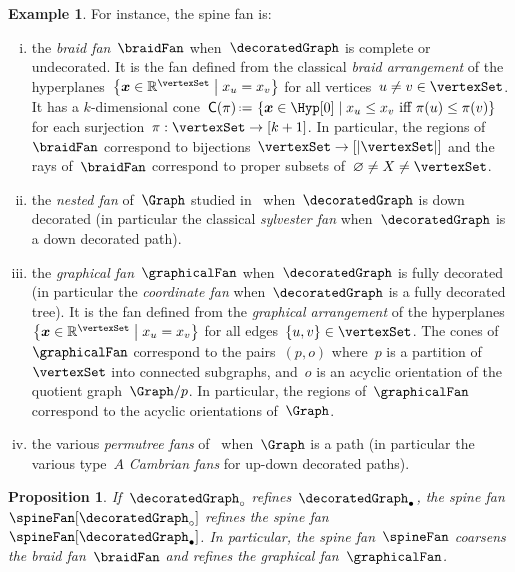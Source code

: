 \documentclass{amsart}
\newtheorem{proposition}[theorem]{Proposition}
\theoremstyle{definition}
\newtheorem{example}[theorem]{Example}
\newcommand{\R}{\mathbb{R}} %
\renewcommand{\b}[1]{{\boldsymbol{#1}}} %
\newcommand{\set}[2]{\left\{ #1 \;\middle|\; #2 \right\}} %
\newcommand{\eqdef}{\mbox{\,\raisebox{0.2ex}{\scriptsize\ensuremath{\mathrm:}}\ensuremath{=}\,}} %
\newcommand{\darkblue}{\color{darkblue}} %
\newcommand{\defn}[1]{\textsl{\darkblue #1}} %
\newcommand{\normalCone}{\mathsf{C}} %
\begin{document}
\begin{example}
  \label{exm:spineFans}
  For instance, the spine fan is:
  \begin{enumerate}[(i)]
    \item the \defn{braid fan}~$\braidFan$ when~$\decoratedGraph$ is complete or undecorated. It is the fan defined from the classical \defn{braid arrangement} of the hyperplanes~$\set{\b{x} \in \R^{\vertexSet}}{x_u = x_v}$ for all vertices~$u \ne v \in \vertexSet$. It has a $k$-dimensional cone~$\normalCone(\pi) \eqdef \set{\b{x} \in \Hyp[0]}{x_u \le x_v \text{ iff } \pi(u) \le \pi(v)}$ for each surjection~$\pi : \vertexSet \to [k+1]$. In particular, the regions of~$\braidFan$ correspond to bijections~${\vertexSet \to [|\vertexSet|]}$ and the rays of~$\braidFan$ correspond to proper subsets of~$\varnothing \ne X \ne \vertexSet$.
    \item the \defn{nested fan} of~$\Graph$ studied in~\cite{CarrDevadoss, Zelevinsky} when~$\decoratedGraph$ is down decorated (in particular the classical \defn{sylvester fan} when~$\decoratedGraph$ is a down decorated path).
    \item the \defn{graphical fan}~$\graphicalFan$ when~$\decoratedGraph$ is fully decorated (in particular the \defn{coordinate fan} when~$\decoratedGraph$ is a fully decorated tree). It is the fan defined from the \defn{graphical arrangement} of the hyperplanes~$\set{\b{x} \in \R^{\vertexSet}}{x_u = x_v}$ for all edges~$\{u, v\} \in \vertexSet$. The cones of~$\graphicalFan$ correspond to the pairs~$(p,o)$ where~$p$ is a partition of~$\vertexSet$ into connected subgraphs, and~$o$ is an acyclic orientation of the quotient graph~$\Graph/p$. In particular, the regions of~$\graphicalFan$ correspond to the acyclic orientations of~$\Graph$.
    \item the various \defn{permutree fans} of~\cite{PilaudPons-permutrees} when~$\Graph$ is a path (in particular the various type~$A$ \defn{Cambrian fans} for up-down decorated paths).
  \end{enumerate}
\end{example}

\begin{proposition}
  \label{prop:refinementSpineFan}
  If~$\decoratedGraph_\circ$ refines~$\decoratedGraph_\bullet$, the spine fan~$\spineFan[\decoratedGraph_\circ]$ refines the spine fan~$\spineFan[\decoratedGraph_\bullet]$.
  In particular, the spine fan~$\spineFan$ coarsens the braid fan~$\braidFan$ and refines the graphical fan~$\graphicalFan$.
\end{proposition}
\end{document}
